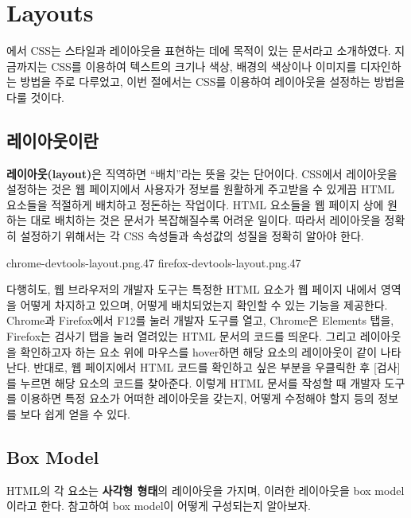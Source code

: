 \section{Layouts} \label{sect:layouts}

에서 CSS는 스타일과 레이아웃을 표현하는 데에 목적이 있는 문서라고 소개하였다. 지금까지는 CSS를 이용하여 텍스트의 크기나 색상, 배경의 색상이나 이미지를 디자인하는 방법을 주로 다루었고, 이번 절에서는 CSS를 이용하여 레이아웃을 설정하는 방법을 다룰 것이다.

\subsection*{레이아웃이란}
\textbf{레이아웃(layout)}은 직역하면 ``배치''라는 뜻을 갖는 단어이다. CSS에서 레이아웃을 설정하는 것은 웹 페이지에서 사용자가 정보를 원활하게 주고받을 수 있게끔 HTML 요소들을 적절하게 배치하고 정돈하는 작업이다. HTML 요소들을 웹 페이지 상에 원하는 대로 배치하는 것은 문서가 복잡해질수록 어려운 일이다. 따라서 레이아웃을 정확히 설정하기 위해서는 각 CSS 속성들과 속성값의 성질을 정확히 알아야 한다.

    {
            {chrome-devtools-layout.png}{.47}
            {firefox-devtools-layout.png}{.47}
    }

다행히도, 웹 브라우저의 개발자 도구는 특정한 HTML 요소가 웹 페이지 내에서 영역을 어떻게 차지하고 있으며, 어떻게 배치되었는지 확인할 수 있는 기능을 제공한다. Chrome과 Firefox에서 F12를 눌러 개발자 도구를 열고, Chrome은 Elements 탭을, Firefox는 검사기 탭을 눌러 열려있는 HTML 문서의 코드를 띄운다. 그리고 레이아웃을 확인하고자 하는 요소 위에 마우스를 hover하면 해당 요소의 레이아웃이 \과 같이 나타난다. 반대로, 웹 페이지에서 HTML 코드를 확인하고 싶은 부분을 우클릭한 후 [검사]를 누르면 해당 요소의 코드를 찾아준다. 이렇게 HTML 문서를 작성할 때 개발자 도구를 이용하면 특정 요소가 어떠한 레이아웃을 갖는지, 어떻게 수정해야 할지 등의 정보를 보다 쉽게 얻을 수 있다.

\subsection*{Box Model}
HTML의 각 요소는 \textbf{사각형 형태}의 레이아웃을 가지며, 이러한 레이아웃을 box model이라고 한다. \을 참고하여 box model이 어떻게 구성되는지 알아보자.

